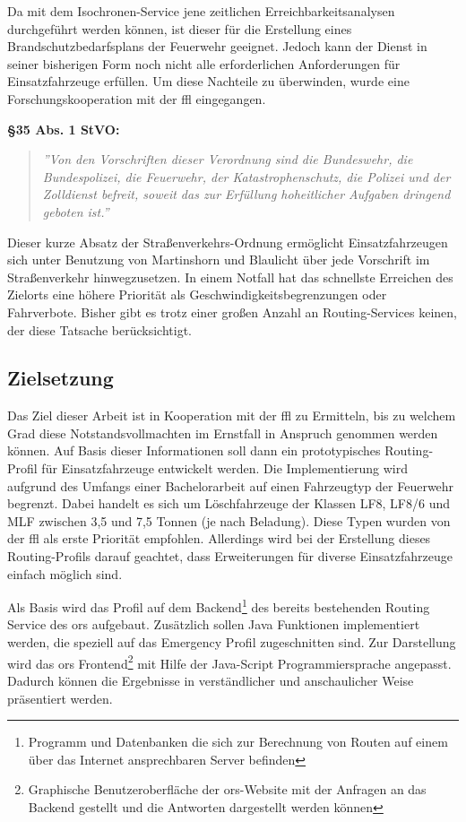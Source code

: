 \documentclass[12pt,a4paper]{article}
\begin{document}
Da mit dem Isochronen-Service jene zeitlichen Erreichbarkeitsanalysen durchgeführt werden können, ist dieser für die Erstellung eines Brandschutzbedarfsplans der Feuerwehr geeignet. Jedoch kann der Dienst in seiner bisherigen Form noch nicht alle erforderlichen Anforderungen für Einsatzfahrzeuge erfüllen. Um diese Nachteile zu überwinden, wurde eine Forschungskooperation mit der \gls{ffl} eingegangen.
\vspace{1.2cm}

\textbf{§35 Abs. 1 StVO:}
\begin{quotation}
\label{cit:STVO}
{\itshape\rmfamily ''Von den Vorschriften dieser Verordnung sind die Bundeswehr, die Bundespolizei, die Feuerwehr, der Katastrophenschutz, die Polizei und der Zolldienst befreit, soweit das zur Erfüllung hoheitlicher Aufgaben dringend geboten ist.''}
\end{quotation}

\vspace{1.2cm}

Dieser kurze Absatz der Straßenverkehrs-Ordnung ermöglicht Einsatzfahrzeugen sich unter Benutzung von Martinshorn und Blaulicht über jede Vorschrift im Straßenverkehr hinwegzusetzen. In einem Notfall hat das schnellste Erreichen des Zielorts eine höhere Priorität als Geschwindigkeitsbegrenzungen oder Fahrverbote. Bisher gibt es trotz einer großen Anzahl an Routing-Services keinen, der diese Tatsache berücksichtigt. 


\subsection{Zielsetzung}
Das Ziel dieser Arbeit ist in Kooperation mit der \gls{ffl} zu Ermitteln, bis zu welchem Grad diese Notstandsvollmachten im Ernstfall in Anspruch genommen werden können. Auf Basis dieser Informationen soll dann ein prototypisches Routing-Profil für Einsatzfahrzeuge entwickelt werden. Die Implementierung wird aufgrund des Umfangs einer Bachelorarbeit auf einen Fahrzeugtyp der Feuerwehr begrenzt. Dabei handelt es sich um Löschfahrzeuge der Klassen LF8, LF8/6 und MLF zwischen 3,5 und 7,5 Tonnen (je nach Beladung). Diese Typen wurden von der \gls{ffl} als erste Priorität empfohlen. Allerdings wird bei der Erstellung dieses Routing-Profils darauf geachtet, dass Erweiterungen für diverse Einsatzfahrzeuge einfach möglich sind.
\vspace{0.5cm}

Als Basis wird das Profil auf dem Backend\footnote{Programm und Datenbanken die sich zur Berechnung von Routen auf einem über das Internet ansprechbaren Server befinden} des bereits bestehenden Routing Service des \gls{ors} aufgebaut. Zusätzlich sollen Java Funktionen implementiert werden, die speziell auf das Emergency Profil zugeschnitten sind. Zur Darstellung wird das \gls{ors} Frontend\footnote{Graphische Benutzeroberfläche der \gls{ors}-Website mit der Anfragen an das Backend gestellt und die Antworten dargestellt werden können} mit Hilfe der Java-Script Programmiersprache angepasst. Dadurch können die Ergebnisse in verständlicher und anschaulicher Weise präsentiert werden.
\end{document}
